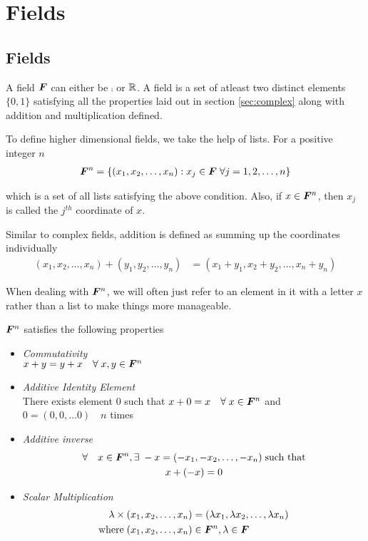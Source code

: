 \documentclass[../../linear_algebra.tex]{subfiles}
\begin{document}
\section{Fields}


\subsection{Fields}
A field $\bm{F}$ can either be $\comp$ or $\mathbb{R}$. A field is a set of atleast two distinct elements $\{0, 1\}$ satisfying all the properties laid out in section \ref{sec:complex} along with addition and multiplication defined.\newline

To define higher dimensional fields, we take the help of lists. For a positive integer $n$
\begin{align*}
    \bm{F}^{n} = \{(x_{1}, x_{2}, \ldots, x_{n}) : x_{j} \in \bm{F} \; \forall j = 1, 2, \ldots, n\}
\end{align*}

which is a set of all lists satisfying the above condition. Also, if $x \in \bm{F}^{n}$, then $x_{j}$ is called the $j^{th}$ coordinate of $x$.\newline

Similar to complex fields, addition is defined as summing up the coordinates individually
\begin{align*}
    (x_{1}, x_{2}, \ldots, x_{n}) + (y_{1}, y_{2}, \ldots, y_{n}) &= (x_{1} + y_{1}, x_{2} + y_{2}, \ldots, x_{n} + y_{n})
\end{align*}

When dealing with $\bm{F}^{n}$, we will often just refer to an element in it with a letter $x$ rather than a list to make things more manageable.\newline

$\bm{F}^{n}$ satisfies the following properties
\begin{itemize}
    \item \emph{Commutativity}\\
    $x + y = y + x \quad \forall \; x, y \in \bm{F}^{n}$
    \item \emph{Additive Identity Element}\\
    There exists element $0$ such that\newline
    $x + 0 = x \quad \forall \; x \in \bm{F}^{n}$ and $0 = (0, 0, \ldots 0) \quad n $ times
    \item \emph{Additive inverse}
    \begin{gather*}
        \forall \quad x \in \bm{F}^{n}, \exists \; -x = (-x_{1}, -x_{2}, \ldots, -x_{n}) \; \text{such that}\\
        x + (-x) = 0
    \end{gather*}
    \item \emph{Scalar Multiplication}
    \begin{align*}
        \lambda \times (x_{1}, x_{2}, \ldots, x_{n}) &= (\lambda x_{1}, \lambda x_{2}, \ldots, \lambda x_{n})\\
        \text{where} \; (x_{1}, x_{2}, \ldots, x_{n}) &\in \bm{F}^{n}, \lambda \in \bm{F}
    \end{align*}
\end{itemize}
\end{document}
